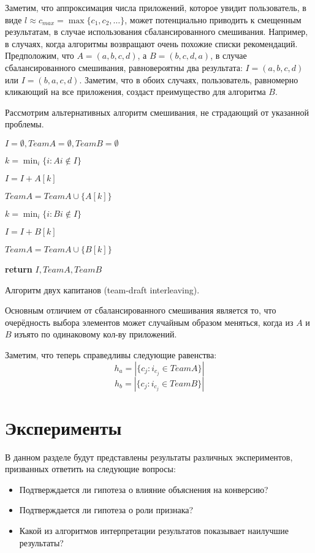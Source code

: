 \documentclass[12pt,a4paper]{report}
\begin{document}
Заметим, что аппроксимация числа приложений, которое увидит пользователь, в виде $l \approx c_{max} = \max\{c_1,c_2,\dots\}$, может потенциально приводить к смещенным результатам, в случае использования сбалансированного смешивания. Например, в случаях, когда алгоритмы возвращают очень похожие списки рекомендаций. Предположим, что $A = (a, b, c, d)$, а $B = (b, c, d, a)$, в случае сбалансированного смешивания, равновероятны два результата: $I=(a, b, c, d)$ или $I=(b, a, c, d)$. Заметим, что в обоих случаях, пользователь, равномерно кликающий на все приложения, создаст преимущество для алгоритма $B$.

Рассмотрим альтернативных алгоритм смешивания, не страдающий от указанной проблемы.


\begin{algorithm}[H]
\SetAlgoLined
{}
$I = \emptyset, TeamA = \emptyset, TeamB = \emptyset$

 {
	 {
		$k=\min_i\{i: A{i}\notin I\}$
		
		$I = I + A[k]$
		
		$TeamA = TeamA \cup \{A[k]\}$
	} {
		$k=\min_i\{i: B{i}\notin I\}$
				
		$I = I + B[k]$
		
		$TeamA = TeamA \cup \{B[k]\}$
	}
}
\textbf{return} $I, TeamA, TeamB$
\caption{Алгоритм двух капитанов (team-draft interleaving).}
\label{alg:BI}
\end{algorithm}

Основным отличием от сбалансированного смешивания является то, что очерёдность выбора элементов может случайным образом меняться, когда из $A$ и $B$ изъято по одинаковому кол-ву приложений.

Заметим, что теперь справедливы следующие равенства:
\begin{equation*}
h_a = |\{c_j: i_{c_j} \in TeamA\}|
\end{equation*}
\begin{equation*}
h_b = |\{c_j: i_{c_j} \in TeamB\}|
\end{equation*}

\section{Эксперименты}
В данном разделе будут представлены результаты различных экспериментов, призванных ответить на следующие вопросы:
\begin{itemize}
\item Подтверждается ли гипотеза о влияние объяснения на конверсию?
\item Подтверждается ли гипотеза о роли признака?
\item Какой из алгоритмов интерпретации результатов показывает наилучшие результаты?
\end{itemize}
\end{document}
